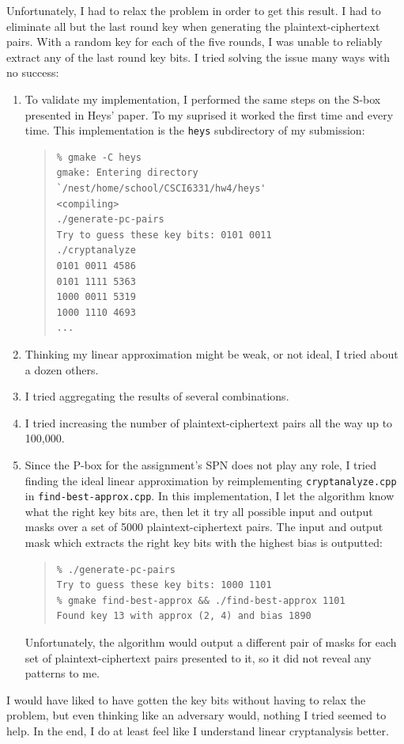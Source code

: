 \documentclass{amsart}
\begin{document}
Unfortunately, I had to relax the problem in order to get this result.  I had to eliminate all but the last round key when generating the plaintext-ciphertext pairs.  With a random key for each of the five rounds, I was unable to reliably extract any of the last round key bits.  I tried solving the issue many ways with no success:

\begin{enumerate}
\item To validate my implementation, I performed the same steps on the S-box presented in Heys' paper.  To my suprised it worked the first time and every time.  This implementation is the \texttt{heys} subdirectory of my submission:
\begin{quote}
\begin{verbatim}
% gmake -C heys 
gmake: Entering directory `/nest/home/school/CSCI6331/hw4/heys'
<compiling>
./generate-pc-pairs
Try to guess these key bits: 0101 0011 
./cryptanalyze
0101 0011 4586
0101 1111 5363
1000 0011 5319
1000 1110 4693
...
\end{verbatim}
\end{quote}

\item Thinking my linear approximation might be weak, or not ideal, I tried about a dozen others.

\item I tried aggregating the results of several combinations.

\item I tried increasing the number of plaintext-ciphertext pairs all the way up to 100,000.

\item Since the P-box for the assignment's SPN does not play any role, I tried finding the ideal linear approximation by reimplementing \texttt{cryptanalyze.cpp} in \texttt{find-best-approx.cpp}.  In this implementation, I let the algorithm know what the right key bits are, then let it try all possible input and output masks over a set of 5000 plaintext-ciphertext pairs.  The input and output mask which extracts the right key bits with the highest bias is outputted:
\begin{quote}
\begin{verbatim}
% ./generate-pc-pairs
Try to guess these key bits: 1000 1101 
% gmake find-best-approx && ./find-best-approx 1101
Found key 13 with approx (2, 4) and bias 1890
\end{verbatim}
\end{quote}
Unfortunately, the algorithm would output a different pair of masks for each set of plaintext-ciphertext pairs presented to it, so it did not reveal any patterns to me.
\end{enumerate}

I would have liked to have gotten the key bits without having to relax the problem, but even thinking like an adversary would, nothing I tried seemed to help.  In the end, I do at least feel like I understand linear cryptanalysis better.
\end{document}
